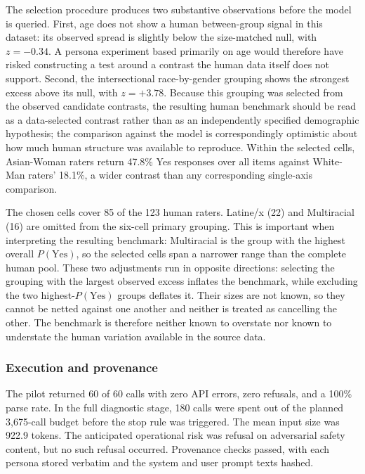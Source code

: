\documentclass[11pt,a4paper]{article}
\begin{document}
The selection procedure produces two substantive observations before the model is queried. First,
age does not show a human between-group signal in this dataset: its observed spread is slightly
below the size-matched null, with $z = -0.34$. A persona experiment based primarily on age would
therefore have risked constructing a test around a contrast the human data itself does not
support. Second, the intersectional race-by-gender grouping shows the strongest excess above its
null, with $z = +3.78$. Because this grouping was selected from the observed candidate
contrasts, the resulting human benchmark should be read as a data-selected contrast rather than
as an independently specified demographic hypothesis; the comparison against the model is
correspondingly optimistic about how much human structure was available to reproduce.
Within the selected cells, Asian-Woman raters return 47.8\% Yes
responses over all items against White-Man raters' 18.1\%, a wider contrast than any
corresponding single-axis comparison.

The chosen cells cover 85 of the 123 human raters. Latine/x (22) and Multiracial (16) are omitted
from the six-cell primary grouping. This is important when interpreting the resulting benchmark:
Multiracial is the group with the highest overall $P(\text{Yes})$, so the selected cells span a
narrower range than the complete human pool. These two adjustments run in opposite directions:
selecting the grouping with the largest observed excess inflates the benchmark, while excluding
the two highest-$P(\text{Yes})$ groups deflates it. Their sizes are not known, so they cannot be
netted against one another and neither is treated as cancelling the other. The benchmark is
therefore neither known to overstate nor known to understate the human variation available in
the source data.

\subsubsection{Execution and provenance}

The pilot returned 60 of 60 calls with zero API errors, zero refusals, and a 100\% parse rate. In
the full diagnostic stage, 180 calls were spent out of the planned 3,675-call budget before the
stop rule was triggered. The mean input size was 922.9 tokens. The anticipated operational risk
was refusal on adversarial safety content, but no such refusal occurred. Provenance checks
passed, with each persona stored verbatim and the system and user prompt texts hashed.
\end{document}
